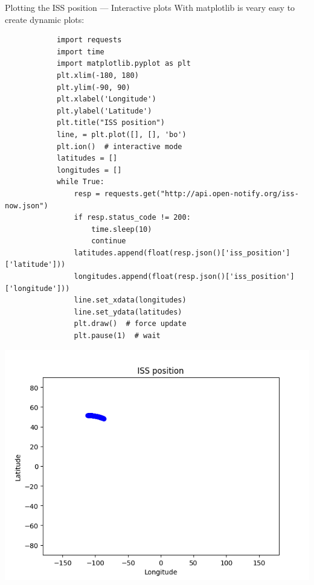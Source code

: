\documentclass[aspectratio=169,handout]{beamer}
\begin{document}
\begin{frame}[fragile]{Plotting the ISS position --- Interactive plots}
    With matplotlib is veary easy to create dynamic plots:
    \begin{minipage}{0.49\textwidth}
        \begin{verbatim}
            import requests
            import time
            import matplotlib.pyplot as plt
            plt.xlim(-180, 180)
            plt.ylim(-90, 90)
            plt.xlabel('Longitude')
            plt.ylabel('Latitude')
            plt.title("ISS position")
            line, = plt.plot([], [], 'bo')
            plt.ion()  # interactive mode
            latitudes = []
            longitudes = []
            while True:
                resp = requests.get("http://api.open-notify.org/iss-now.json")
                if resp.status_code != 200:
                    time.sleep(10)
                    continue
                latitudes.append(float(resp.json()['iss_position']['latitude']))
                longitudes.append(float(resp.json()['iss_position']['longitude']))
                line.set_xdata(longitudes)
                line.set_ydata(latitudes)
                plt.draw()  # force update
                plt.pause(1)  # wait
        \end{verbatim}
    \end{minipage}
    \pause
    \begin{minipage}{0.49\textwidth}
        \begin{flushright}
        \includegraphics[width=.8\textwidth]{./plots/plot_iss.png}
        \end{flushright}
    \end{minipage}
\end{frame}
\end{document}
